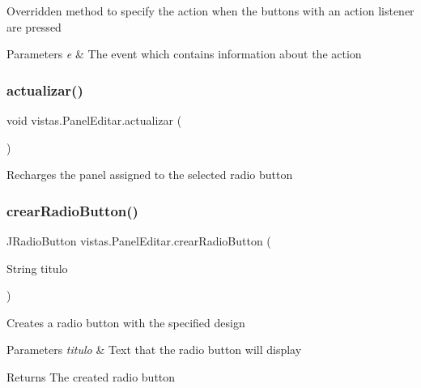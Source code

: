 Overridden method to specify the action when the buttons with an action listener are pressed 
\begin{DoxyParams}{Parameters}
{\em e} & The event which contains information about the action \\
\hline
\end{DoxyParams}
\mbox{\label{classvistas_1_1_panel_editar_a785d026660ee2531aa4fbd29d1377370}} 
\subsubsection{\texorpdfstring{actualizar()}{actualizar()}}
{\footnotesize\ttfamily void vistas.\+Panel\+Editar.\+actualizar (\begin{DoxyParamCaption}{ }\end{DoxyParamCaption})\hspace{0.3cm}{\ttfamily [inline]}}

Recharges the panel assigned to the selected radio button \mbox{\label{classvistas_1_1_panel_editar_aa4871d051f2d6dc289bc087100a49684}} 
\subsubsection{\texorpdfstring{crear\+Radio\+Button()}{crearRadioButton()}}
{\footnotesize\ttfamily J\+Radio\+Button vistas.\+Panel\+Editar.\+crear\+Radio\+Button (\begin{DoxyParamCaption}\item[{String}]{titulo }\end{DoxyParamCaption})\hspace{0.3cm}{\ttfamily [inline]}}

Creates a radio button with the specified design 
\begin{DoxyParams}{Parameters}
{\em titulo} & Text that the radio button will display \\
\hline
\end{DoxyParams}
\begin{DoxyReturn}{Returns}
The created radio button 
\end{DoxyReturn}
\mbox{\label{classvistas_1_1_panel_editar_ab593922475414274e7e85587fa700e48}} 
